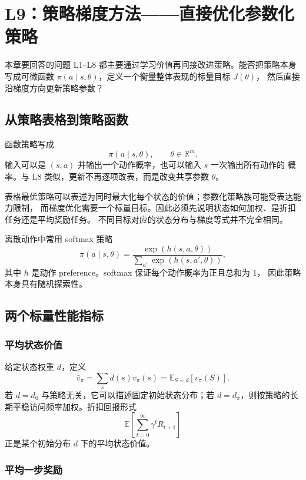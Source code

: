 \documentclass[11pt,a4paper,fontset=fandol]{ctexart}
\newcommand{\E}{\mathbb{E}}
\begin{document}
\clearpage
\section{L9：策略梯度方法——直接优化参数化策略}

\begin{goalbox}{本章要回答的问题}
L1--L8 都主要通过学习价值再间接改进策略。能否把策略本身写成可微函数
\(\pi(a\mid s,\theta)\)，定义一个衡量整体表现的标量目标 \(J(\theta)\)，
然后直接沿梯度方向更新策略参数？
\end{goalbox}

\subsection{从策略表格到策略函数}

函数策略写成
\[
\boxed{\pi(a\mid s,\theta)},
\qquad \theta\in\mathbb R^m.
\]
输入可以是 \((s,a)\) 并输出一个动作概率，也可以输入 \(s\) 一次输出所有动作的
概率。与 L8 类似，更新不再逐项改表，而是改变共享参数 \(\theta\)。

\begin{warningbox}
表格最优策略可以表述为同时最大化每个状态的价值；参数化策略族可能受表达能力限制，
而梯度优化需要一个标量目标。因此必须先说明状态如何加权、是折扣任务还是平均奖励任务。
不同目标对应的状态分布与梯度等式并不完全相同。
\end{warningbox}

离散动作中常用 softmax 策略
\[
\boxed{
\pi(a\mid s,\theta)
=\frac{\exp(h(s,a,\theta))}
{\sum_{a'}\exp(h(s,a',\theta))}},
\]
其中 \(h\) 是动作 preference。softmax 保证每个动作概率为正且总和为 \(1\)，
因此策略本身具有随机探索性。

\subsection{两个标量性能指标}

\subsubsection{平均状态价值}

给定状态权重 \(d\)，定义
\[
\boxed{
\bar v_\pi=\sum_s d(s)v_\pi(s)
=\E_{S\sim d}[v_\pi(S)]}.
\]
若 \(d=d_0\) 与策略无关，它可以描述固定初始状态分布；若
\(d=d_\pi\)，则按策略的长期平稳访问频率加权。折扣回报形式
\[
\E\!\left[\sum_{t=0}^{\infty}\gamma^tR_{t+1}\right]
\]
正是某个初始分布 \(d\) 下的平均状态价值。

\subsubsection{平均一步奖励}
\end{document}
